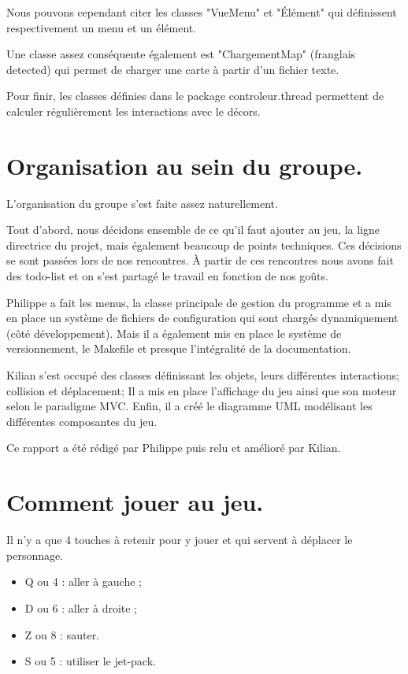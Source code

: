 Nous pouvons cependant citer les classes "VueMenu" et "Élément" qui définissent respectivement un menu et un élément.

Une classe assez conséquente également est "ChargementMap" (franglais detected) 
qui permet de charger une carte à partir d'un fichier texte.

Pour finir, les classes définies dans le package controleur.thread permettent de calculer régulièrement les interactions avec le décors.

\section{Organisation au sein du groupe.}

L'organisation du groupe s'est faite assez naturellement.

Tout d'abord, nous décidons ensemble de ce qu'il faut ajouter au jeu, 
la ligne directrice du projet, mais également beaucoup de points techniques.
Ces décisions se sont passées lors de nos rencontres.
À partir de ces rencontres nous avons fait des todo-list et on s'est partagé le travail en fonction de nos goûts.

Philippe a fait les menus, la classe principale de gestion du programme et a mis en place un système de fichiers de configuration qui sont chargés dynamiquement (côté développement).
Mais il a également mis en place le système de versionnement, le Makefile et presque l'intégralité de la documentation.

Kilian s'est occupé des classes définissant les objets, leurs différentes interactions; collision et déplacement; Il a mis en place l'affichage du jeu ainsi que son moteur selon le paradigme MVC. 
Enfin, il a créé le diagramme UML modélisant les différentes composantes du jeu.

Ce rapport a été rédigé par Philippe puis relu et amélioré par Kilian.

\section{Comment jouer au jeu.}

Il n'y a que 4 touches à retenir pour y jouer et qui servent à déplacer le personnage.

\begin{itemize}
	\item Q ou 4 : aller à gauche ;
	\item D ou 6 : aller à droite ;
	\item Z ou 8 : sauter.
	\item S ou 5 : utiliser le jet-pack.
\end{itemize}

